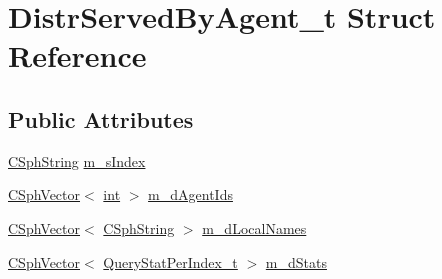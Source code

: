\hypertarget{structDistrServedByAgent__t}{\section{Distr\-Served\-By\-Agent\-\_\-t Struct Reference}
\label{structDistrServedByAgent__t}
}
\subsection*{Public Attributes}
\begin{DoxyCompactItemize}
\item 
\hyperlink{structCSphString}{C\-Sph\-String} \hyperlink{structDistrServedByAgent__t_a25f85eefcb7c2ae4b575e961b3ef54b0}{m\-\_\-s\-Index}
\item 
\hyperlink{classCSphVector}{C\-Sph\-Vector}$<$ \hyperlink{sphinxexpr_8cpp_a4a26e8f9cb8b736e0c4cbf4d16de985e}{int} $>$ \hyperlink{structDistrServedByAgent__t_a874e0aa1414b93ac0ee8836bbe94c89c}{m\-\_\-d\-Agent\-Ids}
\item 
\hyperlink{classCSphVector}{C\-Sph\-Vector}$<$ \hyperlink{structCSphString}{C\-Sph\-String} $>$ \hyperlink{structDistrServedByAgent__t_a1b4c2aab2f3fb2b07c78374cd5fecca4}{m\-\_\-d\-Local\-Names}
\item 
\hyperlink{classCSphVector}{C\-Sph\-Vector}$<$ \hyperlink{structQueryStatPerIndex__t}{Query\-Stat\-Per\-Index\-\_\-t} $>$ \hyperlink{structDistrServedByAgent__t_a5fc98a349750ce0df1cd9ea3caeb2b7f}{m\-\_\-d\-Stats}
\end{DoxyCompactItemize}


